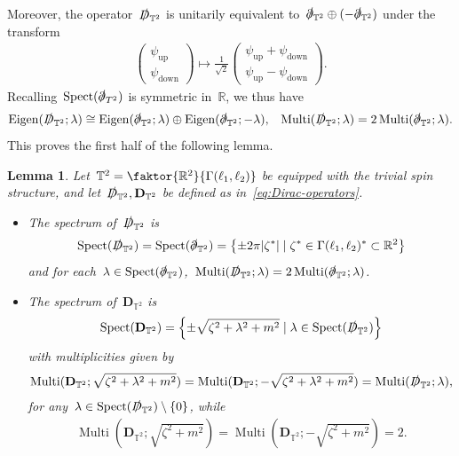 \documentclass[10pt,a4paper]{amsart}
\newcommand{\R}{\mathbb{R}}
\newcommand{\T}{\mathbb{T}}
\newcommand{\D}{\slashed{D}}
\newcommand{\pd}{\slashed{\partial}}
\newcommand{\pD}{\mathbf{D}}
\newcommand{\braces}[1]{\left\{#1\right\}} %
\DeclareMathOperator{\Eigen}{Eigen}
\DeclareMathOperator{\Mtp}{Multi} %
\DeclareMathOperator{\Spect}{Spect}
\DeclareMathOperator{\up}{up}
\DeclareMathOperator{\down}{down}
\newtheorem{lemma}[thm]{Lemma}
\begin{document}
Moreover, the operator~$\D_{\T^2}$ is unitarily equivalent to~$\pd_{\T^2}\oplus (-\pd_{\T^2})$ under the transform 
\begin{align}
    \begin{pmatrix}\psi_{\up} \\ \psi_{\down} \end{pmatrix}
    \mapsto 
    \frac{1}{\sqrt{2}}
    \begin{pmatrix} \psi_{\up}+\psi_{\down} \\ \psi_{\up}-\psi_{\down} \end{pmatrix}. 
\end{align}
Recalling~$\Spect(\pd_{T^2})$ is symmetric in~$\R$, we thus have 
\begin{align}
    \Eigen(\D_{\T^2};\lambda) \cong \Eigen(\pd_{\T^2};\lambda)\oplus\Eigen(\pd_{\T^2};-\lambda), & & 
    \Mtp(\D_{\T^2};\lambda)= 2\Mtp(\pd_{\T^2};\lambda).
\end{align}
This proves the first half of the following lemma. 

\begin{lemma}\label{lemma:spectrum}
    Let~$\mathbb{T}^2=\faktor{\R^2}{\Gamma(\ell_1,\ell_2)}$ be equipped with the trivial spin structure, and let~$\D_{\T^2}, \pD_{\T^2}$ be defined as in~\eqref{eq:Dirac-operators}. 
    \begin{itemize}
        \item[(i)] The spectrum of~$\D_{\T^2}$ is 
        \begin{align}
            \Spect(\D_{\T^2})= \Spect(\pd_{\T^2})
            =\braces{\pm 2\pi |\zeta^*| \mid \zeta^*\in \Gamma(\ell_1,\ell_2)^*\subset\R^2}
        \end{align}
        and for each~$\lambda\in \Spect(\pd_{\T^2})$,~$\Mtp(\D_{\T^2};\lambda)= 2\Mtp(\pd_{\T^2};\lambda)$.

        \item[(ii)] The spectrum of~$\pD_{\T^2}$ is 
            \begin{align}
                \Spect(\pD_{\T^2})=\braces{ \pm \sqrt{\zeta^2+\lambda^2+m^2} \mid \lambda \in \Spect(\D_{\T^2})} 
            \end{align}
            with multiplicities given by
            \begin{align}
                \Mtp(\pD_{\T^2};\sqrt{\zeta^2+\lambda^2+m^2})
                =\Mtp(\pD_{\T^2};-\sqrt{\zeta^2+\lambda^2+m^2})
                =\Mtp(\D_{\T^2}; \lambda),
            \end{align}
            for any~$\lambda\in \Spect(\D_{\T^2})\setminus \braces{0}$, while 
            \begin{align}
                \Mtp(\pD_{\T^2};\sqrt{\zeta^2+m^2})
                =\Mtp(\pD_{\T^2};-\sqrt{\zeta^2+m^2})=2.
            \end{align}
    \end{itemize}
    
\end{lemma}
\end{document}
